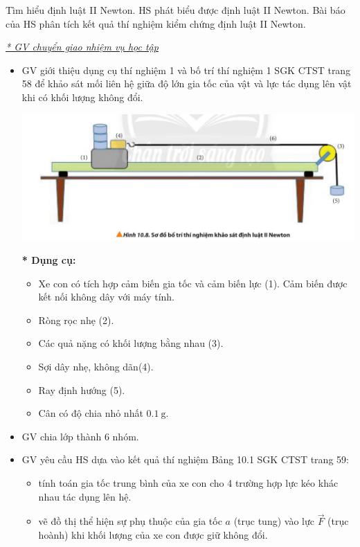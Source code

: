 \hoatdong
{Tìm hiểu định luật II Newton.
}
{HS phát biểu được định luật II Newton.
}
{Bài báo của HS phân tích kết quả thí nghiệm kiểm chứng định luật II Newton.
}
{\textit{\underline{* GV chuyển giao nhiệm vụ học tập}}
	\begin{itemize}[label=-]
		\item GV giới thiệu dụng cụ thí nghiệm 1 và bố trí thí nghiệm 1 SGK CTST trang 58 để  khảo sát mối liên hệ giữa độ lớn gia tốc của vật và lực tác dụng lên vật khi có khối lượng không đổi.
		\begin{center}
			\includegraphics[scale=0.8]{figs/G10-BAI10-8}
		\end{center}
		\textbf{* Dụng cụ:}
		\begin{itemize}[label=$\bullet$]
			\item Xe con có tích hợp cảm biến gia tốc và cảm biến lực (1). Cảm biến được kết nối không dây với máy tính.
			\item Ròng rọc nhẹ (2).
			\item Các quả nặng có khối lượng bằng nhau (3).
			\item Sợi dây nhẹ, không dãn(4).
			\item Ray định hướng (5).
			\item Cân có độ chia nhỏ nhất $\SI{0.1}{\gram}$.
		\end{itemize}
		\item GV chia lớp thành 6 nhóm.
		\item GV yêu cầu HS dựa vào kết quả thí nghiệm Bảng 10.1 SGK CTST trang 59:
		\begin{itemize}[label=$\bullet$]
			\item tính toán gia tốc trung bình của xe con cho 4 trường hợp lực kéo khác nhau tác dụng lên hệ.
			\item vẽ đồ thị thể hiện sự phụ thuộc của gia tốc $a$ (trục tung) vào lực $\vec{F}$ (trục hoành) khi khối lượng của xe con được giữ không đổi.
		\end{itemize}

\end{itemize}}
